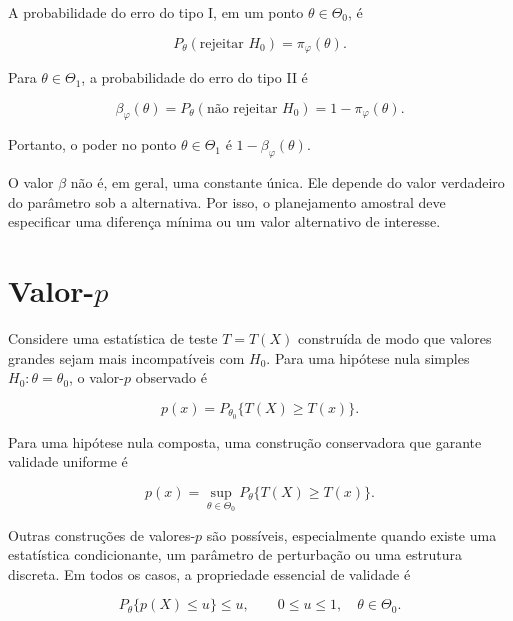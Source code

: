 \documentclass[
  letterpaper,
  DIV=11,
  numbers=noendperiod]{scrreprt}
\begin{document}
A probabilidade do erro do tipo I, em um ponto \(\theta\in\Theta_0\), é

\[P_\theta(\text{rejeitar }H_0)=\pi_\varphi(\theta).\]

Para \(\theta\in\Theta_1\), a probabilidade do erro do tipo II é

\[\beta_\varphi(\theta)
=P_\theta(\text{não rejeitar }H_0)
=1-\pi_\varphi(\theta).\]

Portanto, o poder no ponto \(\theta\in\Theta_1\) é
\(1-\beta_\varphi(\theta)\).

\begin{tcolorbox}[enhanced jigsaw, colback=white, leftrule=.75mm, colbacktitle=quarto-callout-warning-color!10!white, breakable, titlerule=0mm, bottomtitle=1mm, title=\textcolor{quarto-callout-warning-color}{\faExclamationTriangle}\hspace{0.5em}{Observação}, colframe=quarto-callout-warning-color-frame, toprule=.15mm, opacityback=0, bottomrule=.15mm, opacitybacktitle=0.6, arc=.35mm, toptitle=1mm, rightrule=.15mm, coltitle=black, left=2mm]

O valor \(\beta\) não é, em geral, uma constante única. Ele depende do
valor verdadeiro do parâmetro sob a alternativa. Por isso, o
planejamento amostral deve especificar uma diferença mínima ou um valor
alternativo de interesse.

\end{tcolorbox}

\section{\texorpdfstring{Valor-\(p\)}{Valor-p}}\label{valor-p}

Considere uma estatística de teste \(T=T(X)\) construída de modo que
valores grandes sejam mais incompatíveis com \(H_0\). Para uma hipótese
nula simples \(H_0:\theta=\theta_0\), o valor-\(p\) observado é

\[p(x)
=P_{\theta_0}\{T(X)\geq T(x)\}.\]

Para uma hipótese nula composta, uma construção conservadora que garante
validade uniforme é

\[p(x)
=\sup_{\theta\in\Theta_0}
P_\theta\{T(X)\geq T(x)\}.\]

Outras construções de valores-\(p\) são possíveis, especialmente quando
existe uma estatística condicionante, um parâmetro de perturbação ou uma
estrutura discreta. Em todos os casos, a propriedade essencial de
validade é

\[P_\theta\{p(X)\leq u\}\leq u,
\qquad 0\leq u\leq1,
\quad \theta\in\Theta_0.\]
\end{document}

